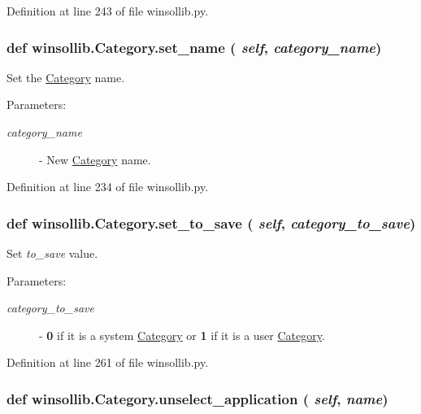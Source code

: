 Definition at line 243 of file winsollib.py.\hypertarget{classwinsollib_1_1Category_c5946ade32f0125e54082e062bc48d4c}{
\subsubsection[set\_\-name]{\setlength{\rightskip}{0pt plus 5cm}def winsollib.Category.set\_\-name ( {\em self},  {\em category\_\-name})}}
\label{classwinsollib_1_1Category_c5946ade32f0125e54082e062bc48d4c}


Set the \hyperlink{classwinsollib_1_1Category}{Category} name. 

\begin{Desc}
\item[Parameters:]
\begin{description}
\item[{\em category\_\-name}]- New \hyperlink{classwinsollib_1_1Category}{Category} name. \end{description}
\end{Desc}


Definition at line 234 of file winsollib.py.\hypertarget{classwinsollib_1_1Category_c70bd81d5ae3a58e3174a6d2cfeca496}{
\subsubsection[set\_\-to\_\-save]{\setlength{\rightskip}{0pt plus 5cm}def winsollib.Category.set\_\-to\_\-save ( {\em self},  {\em category\_\-to\_\-save})}}
\label{classwinsollib_1_1Category_c70bd81d5ae3a58e3174a6d2cfeca496}


Set {\em to\_\-save\/} value. 

\begin{Desc}
\item[Parameters:]
\begin{description}
\item[{\em category\_\-to\_\-save}]- {\bf 0} if it is a system \hyperlink{classwinsollib_1_1Category}{Category} or {\bf 1} if it is a user \hyperlink{classwinsollib_1_1Category}{Category}. \end{description}
\end{Desc}


Definition at line 261 of file winsollib.py.\hypertarget{classwinsollib_1_1Category_c6d6db9af6a3d8a62de9c77fe2f99569}{
\subsubsection[unselect\_\-application]{\setlength{\rightskip}{0pt plus 5cm}def winsollib.Category.unselect\_\-application ( {\em self},  {\em name})}}
\label{classwinsollib_1_1Category_c6d6db9af6a3d8a62de9c77fe2f99569}


